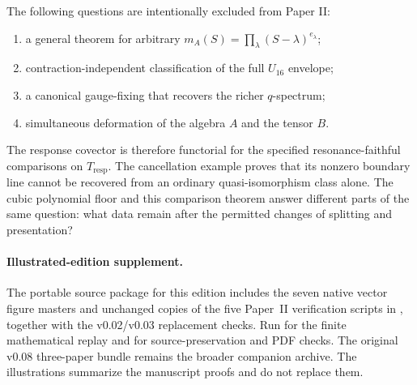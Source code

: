 \documentclass[11pt]{amsart}
\begin{document}
The following questions are intentionally excluded from Paper II:

\begin{enumerate}[label=(\arabic*)]
\item a general theorem for arbitrary \(m_A(S)=\prod_\lambda(S-\lambda)^{e_\lambda}\);

\item contraction-independent classification of the full \(U_{16}\) envelope;
\item a canonical gauge-fixing that recovers the richer \(q\)-spectrum;
\item simultaneous deformation of the algebra \(A\) and the tensor \(B\).
\end{enumerate}

The response covector is therefore functorial for the specified resonance-faithful
comparisons on \(T_{\mathrm{resp}}\). The cancellation example proves that its
nonzero boundary line cannot be recovered from an ordinary quasi-isomorphism class
alone. The cubic polynomial floor and this comparison theorem answer different
parts of the same question: what data remain after the permitted changes of
splitting and presentation?


\paragraph{Illustrated-edition supplement.}
The portable source package for this edition includes the seven native vector
figure masters and unchanged copies of the five Paper~II verification scripts
in , together with the v0.02/v0.03
replacement checks. Run  for the finite mathematical
replay and  for source-preservation and PDF checks.
The original v0.08 three-paper bundle remains the broader companion archive.
The illustrations summarize the manuscript proofs and do not replace them.
\end{document}
